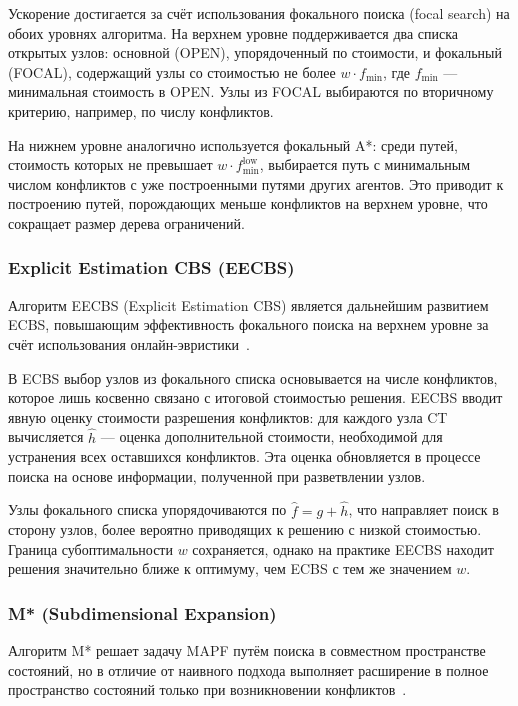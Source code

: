 Ускорение достигается за счёт использования фокального поиска (focal search) на обоих уровнях алгоритма. На верхнем уровне поддерживается два списка открытых узлов: основной (OPEN), упорядоченный по стоимости, и фокальный (FOCAL), содержащий узлы со стоимостью не более $w \cdot f_{\min}$, где $f_{\min}$ --- минимальная стоимость в OPEN. Узлы из FOCAL выбираются по вторичному критерию, например, по числу конфликтов.

На нижнем уровне аналогично используется фокальный A*: среди путей, стоимость которых не превышает $w \cdot f_{\min}^{\text{low}}$, выбирается путь с минимальным числом конфликтов с уже построенными путями других агентов. Это приводит к построению путей, порождающих меньше конфликтов на верхнем уровне, что сокращает размер дерева ограничений.

\subsubsection{Explicit Estimation CBS (EECBS)}

Алгоритм EECBS (Explicit Estimation CBS) является дальнейшим развитием ECBS, повышающим эффективность фокального поиска на верхнем уровне за счёт использования онлайн-эвристики~\cite{li2021eecbs}.

В ECBS выбор узлов из фокального списка основывается на числе конфликтов, которое лишь косвенно связано с итоговой стоимостью решения. EECBS вводит явную оценку стоимости разрешения конфликтов: для каждого узла CT вычисляется $\hat{h}$ --- оценка дополнительной стоимости, необходимой для устранения всех оставшихся конфликтов. Эта оценка обновляется в процессе поиска на основе информации, полученной при разветвлении узлов.

Узлы фокального списка упорядочиваются по $\hat{f} = g + \hat{h}$, что направляет поиск в сторону узлов, более вероятно приводящих к решению с низкой стоимостью. Граница субоптимальности $w$ сохраняется, однако на практике EECBS находит решения значительно ближе к оптимуму, чем ECBS с тем же значением $w$.

\subsubsection{M* (Subdimensional Expansion)}

Алгоритм M* решает задачу MAPF путём поиска в совместном пространстве состояний, но в отличие от наивного подхода выполняет расширение в полное пространство состояний только при возникновении конфликтов~\cite{wagner2015mstar}.

